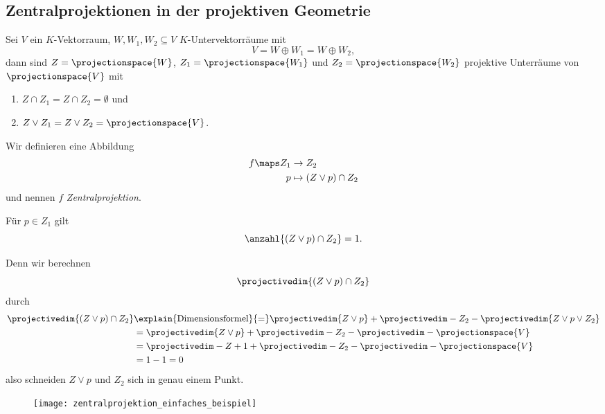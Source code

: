\subsection*{Zentralprojektionen in der projektiven Geometrie}
Sei \( V \) ein \( K \)-Vektorraum, \( W,W_1,W_2\subseteq V \) \( K \)-Untervektorräume mit 
\begin{equation*}
  V=W\oplus W_1=W\oplus W_2,
\end{equation*}
dann sind \( Z=\projectionspace{W} \), \( Z_1=\projectionspace{W_1}  \) und \( Z_2=\projectionspace{W_2} \) projektive Unterräume von \( \projectionspace{V} \) mit
\begin{enumerate}
  \item \( Z\cap Z_1=Z\cap Z_2=\emptyset \) und 
  \item \( Z\vee Z_1=Z\vee Z_2=\projectionspace{V} \).
\end{enumerate}
Wir definieren eine Abbildung
\begin{equation*}
  \begin{split}
    f\maps Z_1&\to Z_2\\
    p&\mapsto (Z\vee p)\cap Z_2
  \end{split}
\end{equation*}
und nennen \( f \) \emph{Zentralprojektion}.
\begin{behauptung*}
  Für \( p\in Z_1 \) gilt
  \begin{equation*}
    \anzahl{(Z\vee p)\cap Z_2}=1.
  \end{equation*}
\end{behauptung*}
Denn wir berechnen
\begin{equation*}
  \projectivedim{(Z\vee p)\cap Z_2}
\end{equation*}
durch 
\begin{align*}
  \projectivedim{(Z\vee p)\cap Z_2}&\explain{\text{Dimensionsformel}}{=}\projectivedim{Z\vee p}+\projectivedim-{Z_2}-\projectivedim{Z\vee p\vee Z_2}\\
  &=\projectivedim{Z\vee p}+\projectivedim-{Z_2}-\projectivedim-{\projectionspace{V}}\\
  &=\projectivedim-{Z}+1+\projectivedim-{Z_2}-\projectivedim-{\projectionspace{V}}\\
  &=1-1=0
\end{align*}
also schneiden \( Z\vee p \) und \( Z_2 \) sich in genau einem Punkt.
\begin{figure}[H]
  \centering
  \texttt{[image: zentralprojektion\_einfaches\_beispiel]}
  \caption*{}
  \label{fig:zentralprojektion_einfaches_beispiel}
\end{figure}
